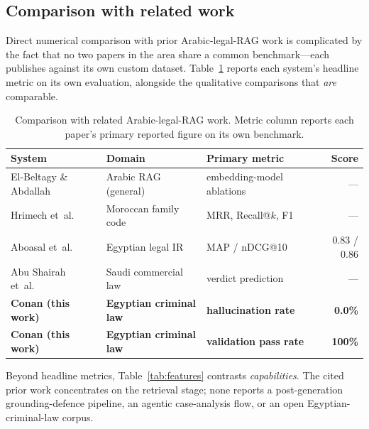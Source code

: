 \documentclass[final,1p,times]{elsarticle}
\newcommand{\thead}[1]{\textbf{#1}}                 %
\begin{document}
\subsection{Comparison with related work}

Direct numerical comparison with prior Arabic-legal-RAG work is complicated
by the fact that no two papers in the area share a common benchmark---each
publishes against its own custom dataset. Table~\ref{tab:compare} reports
each system's headline metric on its own evaluation, alongside the
qualitative comparisons that \emph{are} comparable.

\begin{table}[!htb]
\centering
\caption{Comparison with related Arabic-legal-RAG work. Metric column reports
each paper's primary reported figure on its own benchmark.}
\label{tab:compare}
\setlength{\tabcolsep}{3pt}
\renewcommand{\arraystretch}{1.20}
\begin{tabular}{lllr}
\toprule
\rowcolor{tabhead}
\thead{System} & \thead{Domain} & \thead{Primary metric} & \thead{Score} \\
\midrule
El-Beltagy \& Abdallah~\cite{elbeltagy2024}
       & Arabic RAG (general)
       & embedding-model ablations
       & --- \\
Hrimech et~al.~\cite{hrimech2025}
       & Moroccan family code
       & MRR, Recall@$k$, F1
       & --- \\
Aboasal et~al.~\cite{aboasal2025}
       & Egyptian legal IR
       & MAP / nDCG@10
       & 0.83 / 0.86 \\
Abu Shairah et~al.~\cite{alarb2025}
       & Saudi commercial law
       & verdict prediction
       & --- \\
\midrule
\textbf{Conan (this work)}
       & \textbf{Egyptian criminal law}
       & \textbf{hallucination rate}
       & \textbf{0.0\%} \\
\textbf{Conan (this work)}
       & \textbf{Egyptian criminal law}
       & \textbf{validation pass rate}
       & \textbf{100\%} \\
\bottomrule
\end{tabular}
\end{table}

Beyond headline metrics, Table~\ref{tab:features} contrasts \emph{capabilities}.
The cited prior work concentrates on the retrieval stage; none reports a
post-generation grounding-defence pipeline, an agentic case-analysis flow, or an
open Egyptian-criminal-law corpus.
\end{document}
